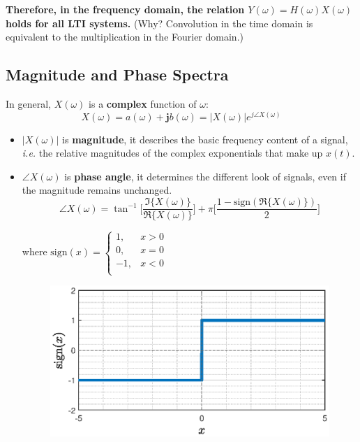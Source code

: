 \textbf{Therefore, in the frequency domain, the relation $Y(\omega) =  H(\omega)  X(\omega)$ holds for all LTI systems.} (Why? Convolution in the time domain is equivalent to the multiplication in the Fourier domain.)

\subsection{Magnitude and Phase Spectra}
In general, $X(\omega)$ is a \textbf{complex} function of $\omega$:
\[ X(\omega)= a(\omega)+\mathbf{j}b(\omega) = \lvert X(\omega) \rvert e^{j\angle X(\omega)}\]
\begin{itemize}
    \item $\lvert X(\omega) \rvert$ is \textbf{magnitude}, it describes the basic frequency content of a signal, \textit{i.e.} the relative magnitudes of the complex exponentials that make up $x(t)$.
    
    \item $\angle X(\omega)$ is \textbf{phase angle}, it determines the different look of signals, even if the magnitude remains unchanged.
    \[ 
    \angle X(\omega) = \tan^{-1} \bigg[\frac{\Im\{X(\omega)\}}{\Re\{X(\omega)\}}\bigg]+\pi \bigg[ \frac{1-\mathrm{sign}(\Re\{X(\omega)\})}{2} \bigg] 
    \]
    \begin{minipage}{0.4\textwidth}
    where $\mathrm{sign}(x)=\begin{cases}
    1, & x>0\\
    0, & x=0\\
    -1, & x<0\\
    \end{cases}$
    \end{minipage}
    \begin{minipage}{0.4\textwidth}
        \begin{figure}[H] 
            \centering
            \includegraphics[width=1.1\textwidth]{images/sign.eps}
        \end{figure}
    \end{minipage}
\end{itemize}

